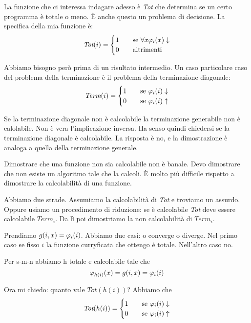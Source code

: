 La funzione che ci interessa indagare adesso è \textit{Tot} che determina se un certo programma è
totale o meno. È anche questo un problema di decisione. La specifica della mia funzione è:
\begin{equation*}
    \textit{Tot}(i) =
    \begin{cases}
        1 \quad &\text{se $\forall x \varphi_{i}(x) \downarrow$} \\
        0 \quad &\text{altrimenti}
    \end{cases}
\end{equation*}

Abbiamo bisogno però prima di un risultato intermedio. Un caso particolare caso del problema della
terminazione è il problema della terminazione diagonale:
\begin{equation*}
    \textit{Term}(i) =
    \begin{cases}
        1 \quad &\text{se $\varphi_{i}(i) \downarrow$} \\
        0 \quad &\text{se $\varphi_{i}(i) \uparrow$} \\
    \end{cases}
\end{equation*}

Se la terminazione diagonale non è calcolabile la terminazione generabile non è calolabile. Non è
vera l'implicazione inversa. Ha senso quindi chiedersi se la terminazione diagonale è calcolabile.
La risposta è no, e la dimostrazione è analoga a quella della terminazione generale.

Dimostrare che una funzione non sia calcolabile non è banale. Devo dimostrare che non esiste un
algoritmo tale che la calcoli. È molto più difficile rispetto a dimostrare la calcolabilità di una
funzione.

Abbiamo due strade. Assumiamo la calcolabilità di \textit{Tot} e troviamo un assurdo. Oppure usiamo
un procedimento di riduzione: se è calcolabile \textit{Tot} deve essere calcolabile
$\textit{Term}_{i}$. Da lì poi dimostriamo la non calcolabilità di $\textit{Term}_{i}$.

Prendiamo $g(i,x) = \varphi_{i}(i)$. Abbiamo due casi: o converge o diverge. Nel primo caso se fisso $i$
la funzione curryficata che ottengo è totale. Nell'altro caso no.

Per s-m-n abbiamo h totale e calcolabile tale che
\begin{equation*}
    \varphi_{h(i)}(x) = g(i,x) = \varphi_{i}(i)
\end{equation*}

Ora mi chiedo: quanto vale $\textit{Tot}(h(i))$? Abbiamo che
\begin{equation*}
    \textit{Tot}(h(i))=
    \begin{cases}
        1 \quad &\text{se $\varphi_{i}(i) \downarrow$} \\
        0 \quad &\text{se $\varphi_{i}(i) \uparrow$}
    \end{cases}
\end{equation*}

